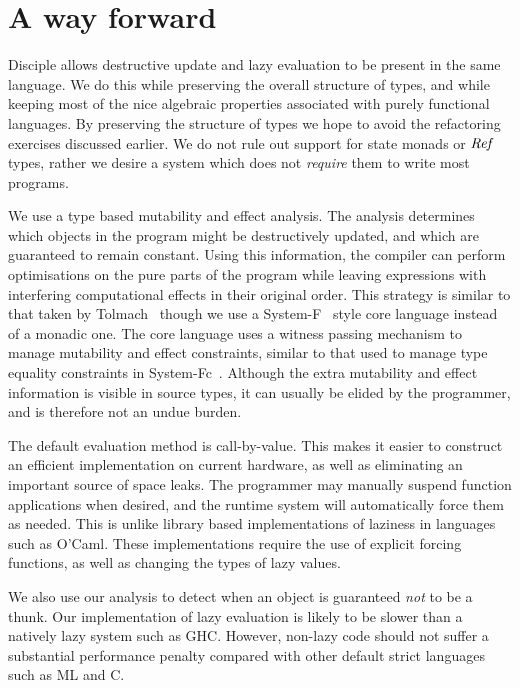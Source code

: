 \section{A way forward}

Disciple allows destructive update and lazy evaluation to be present in the same language. We do this while preserving the overall structure of types, and while keeping most of the nice algebraic properties associated with purely functional languages. By preserving the structure of types we hope to avoid the refactoring exercises discussed earlier. We do not rule out support for state monads or $\operatorname{\mathit{Ref}}$ types, rather we desire a system which does not \emph{require} them to write most programs.

We use a type based mutability and effect analysis. The analysis determines which objects in the program might be destructively updated, and which are guaranteed to remain constant. Using this information, the compiler can perform optimisations on the pure parts of the program while leaving expressions with interfering computational effects in their original order. This strategy is similar to that taken by Tolmach~\cite{tolmach:optimizing-ml} though we use a System-F~\cite{reynolds:towards-a-theory-of-type-structure} style core language instead of a monadic one. The core language uses a witness passing mechanism to manage mutability and effect constraints, similar to that used to manage type equality constraints in System-Fc~\cite{sulzmann:system-Fc}. Although the extra mutability and effect information is visible in source types, it can usually be elided by the programmer, and is therefore not an undue burden.

The default evaluation method is call-by-value. This makes it easier to construct an efficient implementation on current hardware, as well as eliminating an important source of space leaks. The programmer may manually suspend function applications when desired, and the runtime system will automatically force them as needed. This is unlike library based implementations of laziness in languages such as O'Caml. These implementations require the use of explicit forcing functions, as well as changing the types of lazy values. 

We also use our analysis to detect when an object is guaranteed \emph{not} to be a thunk. Our implementation of lazy evaluation is likely to be slower than a natively lazy system such as GHC. However, non-lazy code should not suffer a substantial performance penalty compared with other default strict languages such as ML and C.

